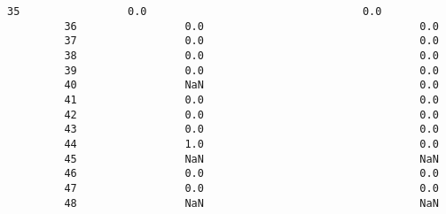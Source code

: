 \documentclass[11pt]{article}
\begin{document}
\begin{Verbatim}[commandchars=\\\{\}]
         35                 0.0                                  0.0   
         36                 0.0                                  0.0   
         37                 0.0                                  0.0   
         38                 0.0                                  0.0   
         39                 0.0                                  0.0   
         40                 NaN                                  0.0   
         41                 0.0                                  0.0   
         42                 0.0                                  0.0   
         43                 0.0                                  0.0   
         44                 1.0                                  0.0   
         45                 NaN                                  NaN   
         46                 0.0                                  0.0   
         47                 0.0                                  0.0   
         48                 NaN                                  NaN   
         

\end{Verbatim}
\end{document}
